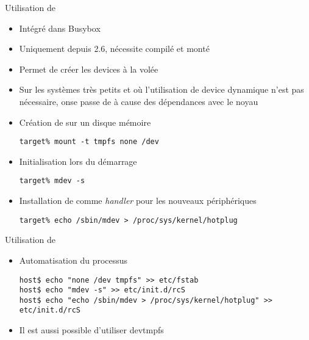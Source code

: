 \begin{frame}[fragile=singleslide]{Utilisation de }
  \begin{itemize}
  \item Intégré dans Busybox
  \item Uniquement depuis 2.6, nécessite  compilé et monté
  \item Permet de créer les devices à la volée
  \item Sur  les systèmes  très petits et  où l'utilisation  de device
    dynamique n'est  pas nécessaire, onse passe de   à cause
    des dépendances avec le noyau
  \item Création de  sur un disque mémoire
    \begin{lstlisting}
target% mount -t tmpfs none /dev
    \end{lstlisting}
  \item Initialisation  lors du démarrage
    \begin{lstlisting}
target% mdev -s
    \end{lstlisting}
  \item  Installation  de    comme \emph{handler}  pour  les
    nouveaux périphériques
    \begin{lstlisting}
target% echo /sbin/mdev > /proc/sys/kernel/hotplug
    \end{lstlisting}
  \end{itemize}
\end{frame}

\begin{frame}[fragile=singleslide]{Utilisation de }
  \begin{itemize}
  \item  Automatisation du processus
    \begin{lstlisting}
host$ echo "none /dev tmpfs" >> etc/fstab
host$ echo "mdev -s" >> etc/init.d/rcS
host$ echo "echo /sbin/mdev > /proc/sys/kernel/hotplug" >> etc/init.d/rcS
    \end{lstlisting}
  \item Il est aussi possible d'utiliser devtmpfs
  \end{itemize}
\end{frame}

